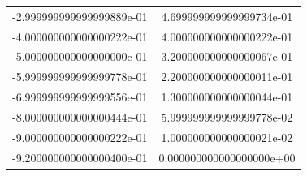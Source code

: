 \begin{table}
\begin{tabular}{S[round-precision = 1]|S[round-precision = 1]}
    -2.999999999999999889e-01 & 4.699999999999999734e-01\\
    -4.000000000000000222e-01 & 4.000000000000000222e-01\\
    -5.000000000000000000e-01 & 3.200000000000000067e-01\\
    -5.999999999999999778e-01 & 2.200000000000000011e-01\\
    -6.999999999999999556e-01 & 1.300000000000000044e-01\\
    -8.000000000000000444e-01 & 5.999999999999999778e-02\\
    -9.000000000000000222e-01 & 1.000000000000000021e-02\\
    -9.200000000000000400e-01 & 0.000000000000000000e+00\\
    \bottomrule
  \end{tabular}
\end{table}

